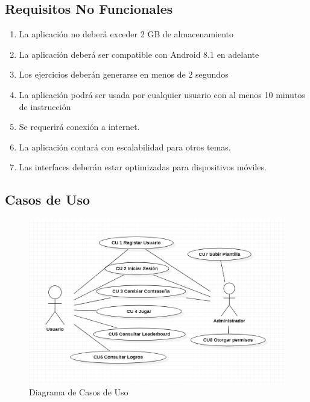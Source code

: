\documentclass{article}
\begin{document}
\subsection{Requisitos No Funcionales}
\begin{enumerate}
\item {La aplicación no deberá exceder 2 GB de almacenamiento}
\item {La aplicación deberá ser compatible con Android 8.1 en adelante}
\item {Los ejercicios deberán generarse en menos de 2 segundos}
\item {La aplicación podrá ser usada por cualquier usuario con al menos 10 minutos de instrucción}
\item {Se requerirá conexión a internet.}
\item {La aplicación contará con escalabilidad para otros temas.}
\item {Las interfaces deberán estar optimizadas para dispositivos móviles.}
\end{enumerate}
\subsection{Casos de Uso}
\begin{figure}[H]
    \centering
    \includegraphics[scale=0.7]{imgs/CasosDeUso}
    \caption{Diagrama de Casos de Uso}
\end{figure}
\end{document}
